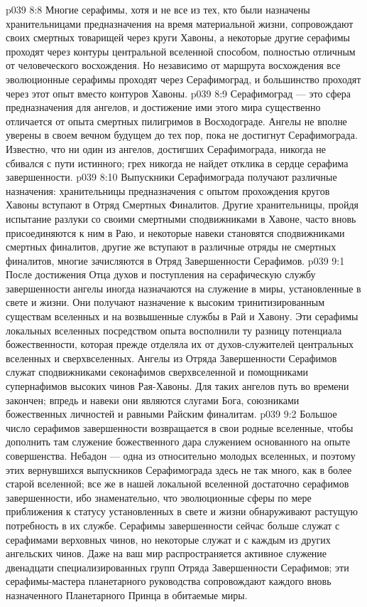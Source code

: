 \vs p039 8:8 Многие серафимы, хотя и не все из тех, кто были назначены хранительницами предназначения на время материальной жизни, сопровождают своих смертных товарищей через круги Хавоны, а некоторые другие серафимы проходят через контуры центральной вселенной способом, полностью отличным от человеческого восхождения. Но независимо от маршрута восхождения все эволюционные серафимы проходят через Серафимоград, и большинство проходят через этот опыт вместо контуров Хавоны.
\vs p039 8:9 \pc Серафимоград --- это сфера предназначения для ангелов, и достижение ими этого мира существенно отличается от опыта смертных пилигримов в Восходограде. Ангелы не вполне уверены в своем вечном будущем до тех пор, пока не достигнут Серафимограда. Известно, что ни один из ангелов, достигших Серафимограда, никогда не сбивался с пути истинного; грех никогда не найдет отклика в сердце серафима завершенности.
\vs p039 8:10 Выпускники Серафимограда получают различные назначения: хранительницы предназначения с опытом прохождения кругов Хавоны вступают в Отряд Смертных Финалитов. Другие хранительницы, пройдя испытание разлуки со своими смертными сподвижниками в Хавоне, часто вновь присоединяются к ним в Раю, и некоторые навеки становятся сподвижниками смертных финалитов, другие же вступают в различные отряды не смертных финалитов, многие зачисляются в Отряд Завершенности Серафимов.
\vs p039 9:1 После достижения Отца духов и поступления на серафическую службу завершенности ангелы иногда назначаются на служение в миры, установленные в свете и жизни. Они получают назначение к высоким тринитизированным существам вселенных и на возвышенные службы в Рай и Хавону. Эти серафимы локальных вселенных посредством опыта восполнили ту разницу потенциала божественности, которая прежде отделяла их от духов\hyp{}служителей центральных вселенных и сверхвселенных. Ангелы из Отряда Завершенности Серафимов служат сподвижниками секонафимов сверхвселенной и помощниками супернафимов высоких чинов Рая\hyp{}Хавоны. Для таких ангелов путь во времени закончен; впредь и навеки они являются слугами Бога, союзниками божественных личностей и равными Райским финалитам.
\vs p039 9:2 Большое число серафимов завершенности возвращается в свои родные вселенные, чтобы дополнить там служение божественного дара служением основанного на опыте совершенства. Небадон --- одна из относительно молодых вселенных, и поэтому этих вернувшихся выпускников Серафимограда здесь не так много, как в более старой вселенной; все же в нашей локальной вселенной достаточно серафимов завершенности, ибо знаменательно, что эволюционные сферы по мере приближения к статусу установленных в свете и жизни обнаруживают растущую потребность в их службе. Серафимы завершенности сейчас больше служат с серафимами верховных чинов, но некоторые служат и с каждым из других ангельских чинов. Даже на ваш мир распространяется активное служение двенадцати специализированных групп Отряда Завершенности Серафимов; эти серафимы\hyp{}мастера планетарного руководства сопровождают каждого вновь назначенного Планетарного Принца в обитаемые миры.
